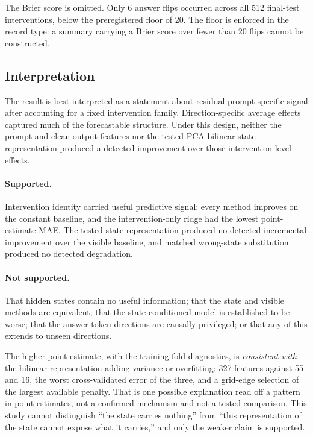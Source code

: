 \documentclass{article}
\begin{document}
The Brier score is omitted. Only 6 answer flips occurred across all 512 final-test interventions,
below the preregistered floor of 20. The floor is enforced in the record type: a summary carrying a
Brier score over fewer than 20 flips cannot be constructed.

\subsection{Interpretation}

The result is best interpreted as a statement about residual prompt-specific signal after accounting
for a fixed intervention family. Direction-specific average effects captured much of the
forecastable structure. Under this design, neither the prompt and clean-output features nor the
tested PCA-bilinear state representation produced a detected improvement over those
intervention-level effects.

\paragraph{Supported.} Intervention identity carried useful predictive signal: every method
improves on the constant baseline, and the intervention-only ridge had the lowest point-estimate
MAE. The tested state representation produced no detected incremental improvement over the visible
baseline, and matched wrong-state substitution produced no detected degradation.

\paragraph{Not supported.} That hidden states contain no useful information; that the state and
visible methods are equivalent; that the state-conditioned model is established to be worse; that
the answer-token directions are causally privileged; or that any of this extends to unseen
directions.

The higher point estimate, with the training-fold diagnostics, is \emph{consistent with} the
bilinear representation adding variance or overfitting: 327 features against 55 and 16, the worst
cross-validated error of the three, and a grid-edge selection of the largest available penalty. That
is one possible explanation read off a pattern in point estimates, not a confirmed mechanism and not
a tested comparison. This study cannot distinguish ``the state carries nothing'' from ``this
representation of the state cannot expose what it carries,'' and only the weaker claim is supported.
\end{document}
